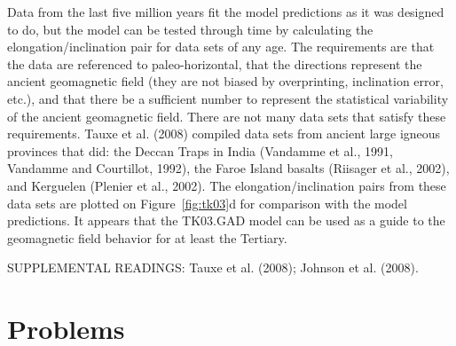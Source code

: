  Data from the last five million years fit the model predictions as it was designed to do, but the model can be tested through time by calculating the elongation/inclination pair for data sets of any age.  The requirements are that the data are referenced to paleo-horizontal,  that the directions represent the ancient geomagnetic field (they are not biased by overprinting, inclination error, etc.), and that there be a sufficient number to represent the statistical variability of the ancient geomagnetic field.   There are not many data sets that satisfy these requirements.  Tauxe et al. (2008) compiled  data sets from ancient large igneous provinces that did:   the Deccan Traps in India (Vandamme et al., 1991, Vandamme and Courtillot, 1992), the Faroe Island basalts (Riisager et al., 2002), and Kerguelen (Plenier et al., 2002).  The elongation/inclination pairs from these data sets are plotted on Figure~\ref{fig:tk03}d for comparison with the model predictions.    It appears that the TK03.GAD model can be used as a guide to the geomagnetic field behavior for at least the Tertiary.   
\vskip 24pt

\noindent SUPPLEMENTAL READINGS:  Tauxe et al. (2008); Johnson et al. (2008).  \nocite{tauxe08,johnson08}


\section{Problems}

